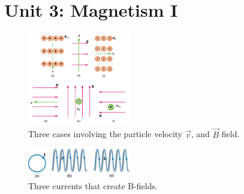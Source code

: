\documentclass[12pt,twocolumn]{article}
\begin{document}
\section{Unit 3: Magnetism I}
\begin{figure}
\centering
\includegraphics[width=0.4\textwidth,trim=0cm 2.8cm 0cm 0cm,clip=true]{Bfield.jpeg}
\caption{\label{fig:B} Three cases involving the particle velocity $\vec{v}$, and $\vec{B}$ field.}
\end{figure}
\begin{figure}
\centering
\includegraphics[width=0.4\textwidth]{coils.jpeg}
\caption{\label{fig:B2} Three currents that create B-fields.}
\end{figure}
\end{document}
